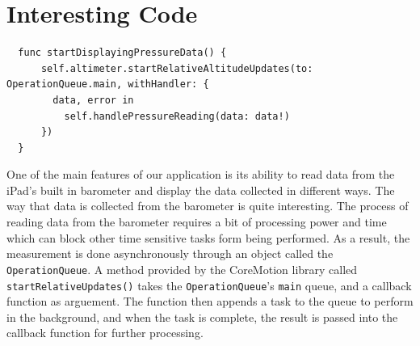 \documentclass[onecolumn, draftclsnofoot,10pt, compsoc]{IEEEtran}
\begin{document}
\section{Interesting Code}
\begin{lstlisting}
  func startDisplayingPressureData() {
      self.altimeter.startRelativeAltitudeUpdates(to: OperationQueue.main, withHandler: {
        data, error in
          self.handlePressureReading(data: data!)
      })
  }

\end{lstlisting}

One of the main features of our application is its ability to read data from the iPad's built in barometer and display the data collected in different ways.
The way that data is collected from the barometer is quite interesting.
The process of reading data from the barometer requires a bit of processing power and time which can block other time sensitive tasks form being performed.
As a result, the measurement is done asynchronously through an object called the \texttt{OperationQueue}.
A method provided by the CoreMotion library called \texttt{startRelativeUpdates()} takes the \texttt{OperationQueue}'s \texttt{main} queue, and a callback function as arguement.
The function then appends a task to the queue to perform in the background, and when the task is complete, the result is passed into the callback function for further processing.\\
\end{document}

